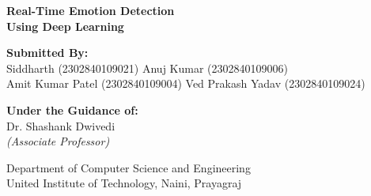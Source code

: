 \documentclass[aspectratio=169]{beamer}
\title{}
\author{}
\date{}
\begin{document}
\begin{frame}[plain]
  \centering
  \vspace{0.5cm}

  \begin{tcolorbox}[
    enhanced,
    width=0.95\textwidth,
    colback=white,
    colframe=blue!20!black,
    boxrule=1pt,
    arc=4mm,
    drop fuzzy shadow={shadow xshift=2pt, shadow yshift=-4pt, shadow color=black!20},
    left=10pt, right=10pt, top=14pt, bottom=14pt,
    halign=center, valign=center
  ]
    {\LARGE\bfseries Real-Time Emotion Detection\\[4pt] Using Deep Learning}
  \end{tcolorbox}

  \vspace{0.6cm}

  {\large
  \begin{spacing}{1.2}
    \textbf{Submitted By:}\\
    Siddharth (2302840109021) \quad Anuj Kumar (2302840109006)\\
    Amit Kumar Patel (2302840109004) \quad Ved Prakash Yadav (2302840109024)
  \end{spacing}
  }

  \vspace{0.4cm}

  {\normalsize
  \textbf{Under the Guidance of:}\\
  Dr. Shashank Dwivedi \\
  \textit{(Associate Professor)}
  }

  \vspace{0.4cm}

  {\small
  Department of Computer Science and Engineering\\
  United Institute of Technology, Naini, Prayagraj
  }

  \vfill
\end{frame}
\end{document}
